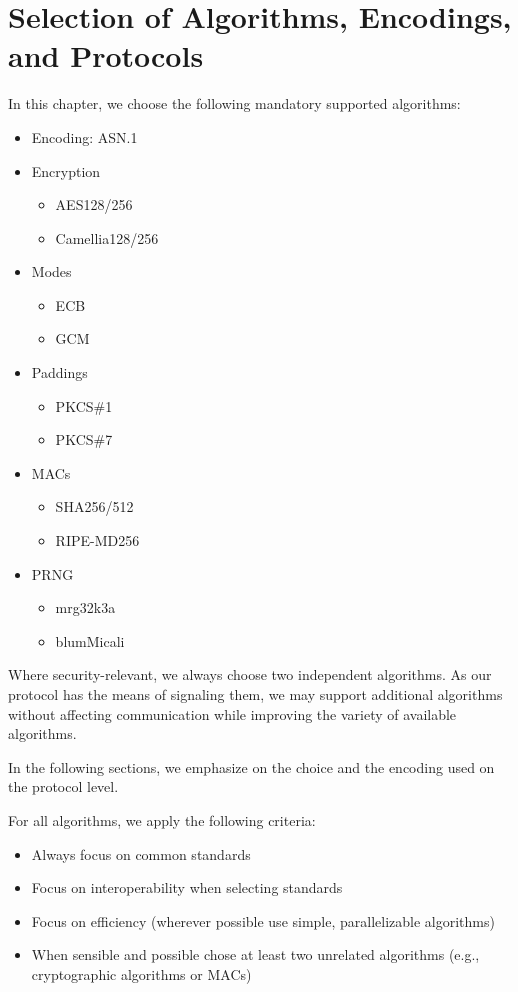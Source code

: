 \chapter[Selecting Algorithms, Encodings, and Protocols]{Selection of Algorithms, Encodings, and Protocols}\label{sec:selection}
In this chapter, we choose the following mandatory supported algorithms:
\begin{itemize}
	\item Encoding: ASN.1
	\item Encryption
	\begin{itemize}
		\item AES128/256
		\item Camellia128/256
	\end{itemize}
	\item Modes
	\begin{itemize}
		\item ECB
		\item GCM
	\end{itemize}
	\item Paddings
	\begin{itemize}
		\item PKCS\#1
		\item PKCS\#7
	\end{itemize}
	\item MACs
	\begin{itemize}
		\item SHA256/512
		\item RIPE-MD256
	\end{itemize}
	\item PRNG
	\begin{itemize}
		\item mrg32k3a
		\item blumMicali
	\end{itemize}
\end{itemize}

Where security-relevant, we always choose two independent algorithms. As our protocol has the means of signaling them, we may support additional algorithms without affecting communication while improving the variety of available algorithms.

In the following sections, we emphasize on the choice and the encoding used on the protocol level.

For all algorithms, we apply the following criteria:
\begin{itemize}
	\item Always focus on common standards
	\item Focus on interoperability when selecting standards
	\item Focus on efficiency (wherever possible use simple, parallelizable algorithms)
	\item When sensible and possible chose at least two unrelated algorithms (e.g., cryptographic algorithms or MACs)
\end{itemize}

